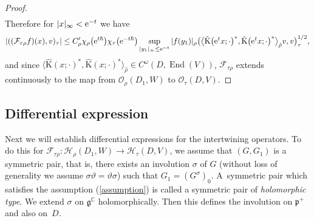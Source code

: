 \documentclass[pdftex]{sigma}
\numberwithin{equation}{section}
\newcommand{\BC}{\mathbb{C}}
\newcommand{\fg}{\mathfrak{g}}
\newcommand{\fp}{\mathfrak{p}}
\newcommand{\cF}{\mathcal{F}}
\newcommand{\cH}{\mathcal{H}}
\newcommand{\cO}{\mathcal{O}}
\newcommand{\rK}{\mathrm{K}}
\newcommand{\End}{\operatorname{End}}
\begin{document}
\begin{proof}
\begin{align*}
\end{align*}
Therefore for $|x|_\infty<{\rm e}^{-t}$ we have
\begin{gather*}
 |((\cF_{\tau\rho}f)(x),v)_\tau|
\le C_\rho'\chi_\rho\big({\rm e}^{t\hbar}\big)\chi_\tau\big({\rm e}^{-t\hbar}\big)\sup_{|y_1|_\infty\le {\rm e}^{-t}}|f(y_1)|_\rho
\big(\big\langle\hat{\rK}\big({\rm e}^tx;\cdot\big)^*,\hat{\rK}\big({\rm e}^tx;\cdot\big)^*\big\rangle_{\hat{\rho}}v,v\big)_\tau^{1/2},
\end{gather*}
and since $\big\langle\hat{\rK}(x;\cdot)^*,\hat{\rK}(x;\cdot)^*\big\rangle_{\hat{\rho}}\in C^\omega(D,\End(V))$,
$\cF_{\tau\rho}$ extends continuously to the map from $\cO_\rho(D_1,W)$ to $\cO_\tau(D,V)$.
\end{proof}

\subsection{Differential expression}
Next we will establish differential expressions for the intertwining operators.
To do this for $\cF_{\tau\rho}\colon \cH_\rho(D_1,W)\to \cH_\tau(D,V)$, we assume that $(G,G_1)$ is a symmetric pair, that is,
there exists an involution $\sigma$ of $G$ (without loss of generality we assume $\sigma\vartheta=\vartheta\sigma$) such that $G_1=(G^\sigma)_0$.
A~symmetric pair which satisfies the assumption (\ref{assumption}) is called a symmetric pair of \textit{holomorphic type}.
We extend $\sigma$ on $\fg^\BC$ holomorphically. Then this defines the involution on $\fp^+$ and also on~$D$.
\end{document}
